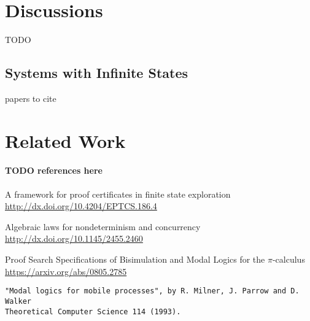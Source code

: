 \documentclass{llncs}
\begin{document}
\section{Discussions}
TODO
\subsection{Systems with Infinite States}
papers to cite


\section{Related Work}


\paragraph{TODO references here}
A framework for proof certificates in finite state exploration\\
\url{http://dx.doi.org/10.4204/EPTCS.186.4}

Algebraic laws for nondeterminism and concurrency\\
\url{http://dx.doi.org/10.1145/2455.2460}

Proof Search Specifications of Bisimulation and Modal Logics for the $\pi$-calculus\\
\url{https://arxiv.org/abs/0805.2785}

\begin{verbatim}
"Modal logics for mobile processes", by R. Milner, J. Parrow and D. Walker
Theoretical Computer Science 114 (1993).
\end{verbatim}
\end{document}
